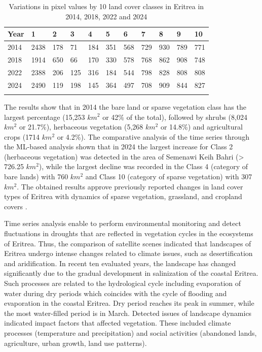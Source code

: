 \documentclass[sn-mathphys-num]{sn-jnl}%
\theoremstyle{thmstyleone}%
\theoremstyle{thmstyletwo}%
\theoremstyle{thmstylethree}%
\begin{document}
\begin{table}[h]
\caption{Variations in pixel values by 10 land cover classes in Eritrea in 2014, 2018, 2022 and 2024}\label{tab03}%
\begin{tabular}{@{}lllllllllll@{}}
  \toprule
   Year & 1 & 2 & 3 & 4 & 5 & 6 & 7 & 8 & 9 & 10 \\
   \midrule
    2014 & 2438 & 178 & 71 & 184 & 351 & 568 & 729 & 930 & 789 & 771 \\
    2018 & 1914 & 650 & 66 & 170 & 330 & 578 & 768 & 862 & 908 & 748 \\
    2022 & 2388 & 206 & 125 & 316 & 184 & 544 & 798 & 828 & 808 & 808 \\
    2024 & 2490 & 119 & 198 & 145 & 364 & 497 & 708 & 909 & 844 & 827 \\
    \botrule
\end{tabular}
\end{table}

{The results show that in 2014 the bare land or sparse vegetation class has the largest percentage (15,253 $km^2$ or 42\% of the total), followed by shrubs (8,024 $km^2$ or 21.7\%), herbaceous vegetation (5,268 $km^2$ or 14.8\%) and agricultural crops (1714 $km^2$ or 4.2\%). The comparative analysis of the time series through the ML-based analysis shown that in 2024 the largest increase for Class 2 (herbaceous vegetation) was detected in the area of Semenawi Keih Bahri (> 726.25 $km^2$), while the largest decline was recorded in the Class 4 (category of bare lands) with 760 $km^2$ and Class 10 (category of sparse vegetation) with 307 $km^2$. The obtained results approve previously reported changes in land cover types of Eritrea with dynamics of sparse vegetation, grassland, and cropland covers} \cite{rs11060724}. 


Time series analysis enable to perform environmental monitoring and detect {fluctuations in} droughts {that are reflected in vegetation cycles} in the ecosystems of {Eritrea}. Thus, the comparison of satellite scenes indicated that landscapes of Eritrea undergo intense changes related to climate issues, such as desertification and aridification. In recent ten evaluated years, the landscape has changed significantly due to the gradual development in salinization of the coastal Eritrea. Such processes are related to the hydrological cycle including evaporation of water during dry periods which coincides with the cycle of flooding and evaporation in the coastal Eritrea. Dry period reaches its peak in summer, while the most water-filled period is in March. {Detected issues of }landscape dynamics{ indicated impact factors that affected vegetation. These included climate processes (temperature and precipitation) and social activities (abandoned lands, agriculture, urban growth, land use patterns)}.  
\end{document}
